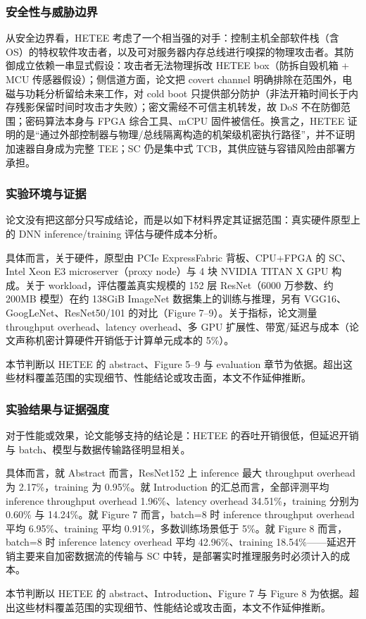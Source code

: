 \documentclass[11pt]{ctexart}
\begin{document}
\subsubsection{安全性与威胁边界}
从安全边界看，HETEE 考虑了一个相当强的对手：控制主机全部软件栈（含 OS）的特权软件攻击者，以及可对服务器内存总线进行嗅探的物理攻击者。其防御成立依赖一串显式假设：攻击者无法物理拆改 HETEE box（防拆自毁机箱 + MCU 传感器假设）；侧信道方面，论文把 covert channel 明确排除在范围外，电磁与功耗分析留给未来工作，对 cold boot 只提供部分防护（非法开箱时间长于内存残影保留时间时攻击才失败）；密文需经不可信主机转发，故 DoS 不在防御范围；密码算法本身与 FPGA 综合工具、mCPU 固件被信任。换言之，HETEE 证明的是``通过外部控制器与物理/总线隔离构造的机架级机密执行路径''，并不证明加速器自身成为完整 TEE；SC 仍是集中式 TCB，其供应链与容错风险由部署方承担。\par
\subsubsection{实验环境与证据}
论文没有把这部分只写成结论，而是以如下材料界定其证据范围：真实硬件原型上的 DNN inference/training 评估与硬件成本分析。\par
具体而言，关于硬件，原型由 PCIe ExpressFabric 背板、CPU+FPGA 的 SC、Intel Xeon E3 microserver（proxy node）与 4 块 NVIDIA TITAN X GPU 构成。关于 workload，评估覆盖真实规模的 152 层 ResNet（6000 万参数、约 200MB 模型）在约 138GiB ImageNet 数据集上的训练与推理，另有 VGG16、GoogLeNet、ResNet50/101 的对比（Figure 7--9）。关于指标，论文测量 throughput overhead、latency overhead、多 GPU 扩展性、带宽/延迟与成本（论文声称机密计算硬件开销低于计算单元成本的 5\%）。\par
本节判断以 HETEE 的 abstract、Figure 5--9 与 evaluation 章节为依据。超出这些材料覆盖范围的实现细节、性能结论或攻击面，本文不作延伸推断。\par
\subsubsection{实验结果与证据强度}
对于性能或效果，论文能够支持的结论是：HETEE 的吞吐开销很低，但延迟开销与 batch、模型与数据传输路径明显相关。\par
具体而言，就 Abstract 而言，ResNet152 上 inference 最大 throughput overhead 为 2.17\%，training 为 0.95\%。就 Introduction 的汇总而言，全部评测平均 inference throughput overhead 1.96\%、latency overhead 34.51\%，training 分别为 0.60\% 与 14.24\%。就 Figure 7 而言，batch=8 时 inference throughput overhead 平均 6.95\%、training 平均 0.91\%，多数训练场景低于 5\%。就 Figure 8 而言，batch=8 时 inference latency overhead 平均 42.96\%、training 18.54\%——延迟开销主要来自加密数据流的传输与 SC 中转，是部署实时推理服务时必须计入的成本。\par
本节判断以 HETEE 的 abstract、Introduction、Figure 7 与 Figure 8 为依据。超出这些材料覆盖范围的实现细节、性能结论或攻击面，本文不作延伸推断。\par
\end{document}
